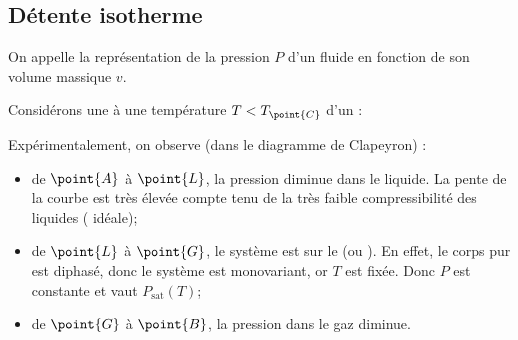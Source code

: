 \subsection{Détente isotherme}

\begin{definition}
On appelle  la représentation de la pression $P$ d'un fluide en fonction de son volume massique $v$.
\end{definition}

\begin{experience}
Considérons une  à une température $T < T_{\point{C}}$ d'un  :

\begin{figure}[H]
\begin{center}
\end{center}
\end{figure}

\noindent Expérimentalement, on observe (dans le diagramme de Clapeyron) :

\begin{figure}[H]
\begin{center}
\end{center}
\end{figure}

\begin{itemize}
\item de $\point{A}$ à $\point{L}$, la pression diminue dans le liquide. La pente de la courbe est très élevée compte tenu de la très faible compressibilité des liquides ( idéale);
\item de $\point{L}$ à $\point{G}$, le système est sur le  (ou ). En effet, le corps pur est diphasé, donc le système est monovariant, or $T$ est fixée. Donc $P$ est constante et vaut $P_{\mathrm{sat}}(T)$;
\item de $\point{G}$ à $\point{B}$, la pression dans le gaz diminue.
\end{itemize}
\end{experience}

